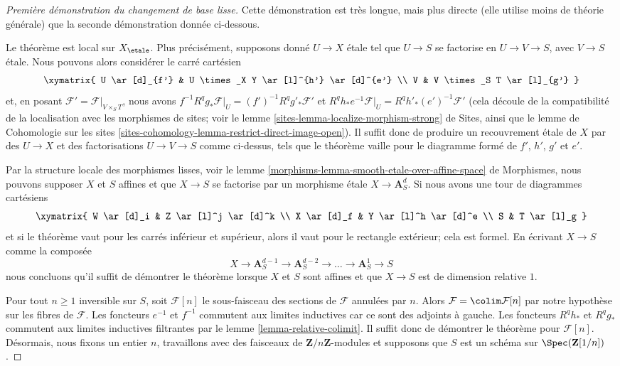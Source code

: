 \begin{proof}[Première démonstration du changement de base lisse]
Cette démonstration est très longue, mais plus directe (elle utilise moins de théorie générale)
que la seconde démonstration donnée ci-dessous.

\medskip\noindent
Le théorème est local sur $X_\etale$. Plus précisément, supposons donné
$U \to X$ étale tel que $U \to S$ se factorise en $U \to V \to S$,
avec $V \to S$ étale. Nous pouvons alors considérer le carré cartésien
$$
\xymatrix{
U \ar[d]_{f'} & U \times_X Y \ar[l]^{h'} \ar[d]^{e'} \\
V & V \times_S T \ar[l]_{g'}
}
$$
et, en posant $\mathcal{F}' = \mathcal{F}|_{V \times_S T}$,
nous avons $f^{-1}R^qg_*\mathcal{F}|_U = (f')^{-1}R^qg'_*\mathcal{F}'$
et $R^qh_*e^{-1}\mathcal{F}|_U = R^qh'_*(e')^{-1}\mathcal{F}'$
(cela découle de la compatibilité de la localisation avec les morphismes de sites; voir le
lemme \ref{sites-lemma-localize-morphism-strong} de Sites,
ainsi que le
lemme de Cohomologie sur les sites
\ref{sites-cohomology-lemma-restrict-direct-image-open}).
Il suffit donc de produire un recouvrement étale de $X$ par des
$U \to X$ et des factorisations $U \to V \to S$
comme ci-dessus, tels que le théorème vaille pour le diagramme formé de
$f'$, $h'$, $g'$ et $e'$.

\medskip\noindent
Par la structure locale des morphismes lisses, voir le
lemme \ref{morphisms-lemma-smooth-etale-over-affine-space} de Morphismes,
nous pouvons supposer $X$ et $S$ affines et que $X \to S$
se factorise par un morphisme étale $X \to \mathbf{A}^d_S$.
Si nous avons une tour de diagrammes cartésiens
$$
\xymatrix{
W \ar[d]_i & Z \ar[l]^j \ar[d]^k \\
X \ar[d]_f & Y \ar[l]^h \ar[d]^e \\
S & T \ar[l]_g
}
$$
et si le théorème vaut pour les carrés inférieur et supérieur, alors
il vaut pour le rectangle extérieur; cela est formel.
En écrivant $X \to S$ comme la composée
$$
X \to \mathbf{A}^{d - 1}_S \to \mathbf{A}^{d - 2}_S \to \ldots \to
\mathbf{A}^1_S \to S
$$
nous concluons qu'il suffit de démontrer le théorème lorsque $X$ et $S$
sont affines et que $X \to S$ est de dimension relative $1$.

\medskip\noindent
Pour tout $n \geq 1$ inversible sur $S$, soit $\mathcal{F}[n]$
le sous-faisceau des sections de $\mathcal{F}$ annulées par $n$. Alors
$\mathcal{F} = \colim \mathcal{F}[n]$ par notre hypothèse sur
les fibres de $\mathcal{F}$. Les foncteurs $e^{-1}$ et $f^{-1}$
commutent aux limites inductives car ce sont des adjoints à gauche. Les foncteurs
$R^qh_*$ et $R^qg_*$ commutent aux limites inductives filtrantes par le
lemme \ref{lemma-relative-colimit}.
Il suffit donc de démontrer le théorème pour $\mathcal{F}[n]$.
Désormais, nous fixons un entier $n$, travaillons avec des
faisceaux de $\mathbf{Z}/n\mathbf{Z}$-modules et
supposons que $S$ est un schéma sur $\Spec(\mathbf{Z}[1/n])$.


\end{proof}
